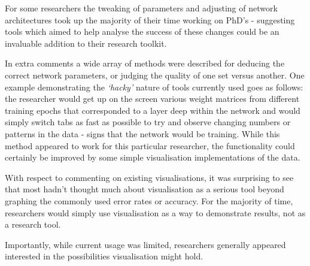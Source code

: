 \documentclass[a4paper,11pt,titlepage]{article}
\begin{document}
	For some researchers the tweaking of parameters and adjusting of network architectures took up the majority of their time working on PhD's - suggesting tools which aimed to help analyse the success of these changes could be an invaluable addition to their research toolkit. 
	\par 
	In extra comments a wide array of methods were described for deducing the correct network parameters, or judging the quality of one set versus another. One example demonstrating the \textit{`hacky'} nature of tools currently used goes as follows: the researcher would get up on the screen various weight matrices from different training epochs that corresponded to a layer deep within the network and would simply switch tabs as fast as possible to try and observe changing numbers or patterns in the data - signs that the network would be training. While this method appeared to work for this particular researcher, the functionality could certainly be improved by some simple visualisation implementations of the data.
	\par 
	
	\begin{figure}[H]
	\end{figure}
	
	With respect to commenting on existing visualisations, it was surprising to see that most hadn't thought much about visualisation as a serious tool beyond graphing the commonly used error rates or accuracy. For the majority of time, researchers would simply use visualisation as a way to demonstrate results, not as a research tool.
	\par 
	Importantly, while current usage was limited, researchers generally appeared interested in the possibilities visualisation might hold.
\end{document}
